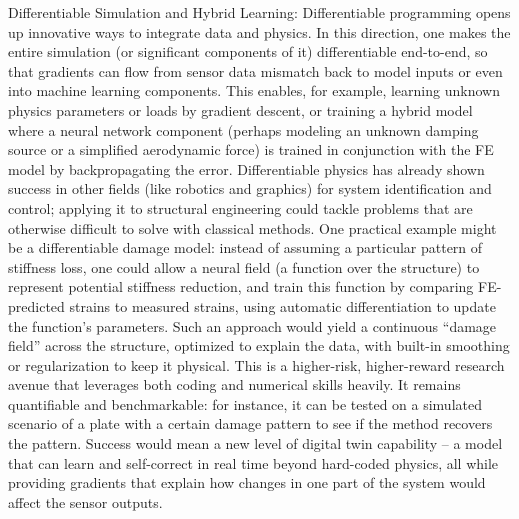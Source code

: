 Differentiable Simulation and Hybrid Learning: Differentiable programming opens up innovative ways to integrate data and physics. In this direction, one makes the entire simulation (or significant components of it) differentiable end-to-end, so that gradients can flow from sensor data mismatch back to model inputs or even into machine learning components. This enables, for example, learning unknown physics parameters or loads by gradient descent, or training a hybrid model where a neural network component (perhaps modeling an unknown damping source or a simplified aerodynamic force) is trained in conjunction with the FE model by backpropagating the error. 
Differentiable physics has already shown success in other fields (like robotics and graphics) for system identification and control; applying it to structural engineering could tackle problems that are otherwise difficult to solve with classical methods. 
One practical example might be a differentiable damage model: instead of assuming a particular pattern of stiffness loss, one could allow a neural field (a function over the structure) to represent potential stiffness reduction, and train this function by comparing FE-predicted strains to measured strains, using automatic differentiation to update the function’s parameters. 
Such an approach would yield a continuous “damage field” across the structure, optimized to explain the data, with built-in smoothing or regularization to keep it physical. This is a higher-risk, higher-reward research avenue that leverages both coding and numerical skills heavily. 
It remains quantifiable and benchmarkable: for instance, it can be tested on a simulated scenario of a plate with a certain damage pattern to see if the method recovers the pattern. Success would mean a new level of digital twin capability – a model that can learn and self-correct in real time beyond hard-coded physics, all while providing gradients that explain how changes in one part of the system would affect the sensor outputs.


